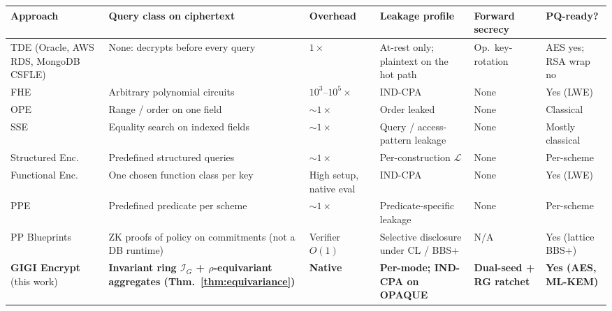 \documentclass[11pt,letterpaper]{article}
\begin{document}
\begin{table}[p]
\small
\setlength{\tabcolsep}{4pt}
\begin{tabular}{>{\raggedright\arraybackslash}p{2.6cm}>{\raggedright\arraybackslash}p{4.1cm}>{\raggedright\arraybackslash}p{1.4cm}>{\raggedright\arraybackslash}p{2.7cm}>{\raggedright\arraybackslash}p{2.0cm}>{\raggedright\arraybackslash}p{1.6cm}}
\toprule
\textbf{Approach} & \textbf{Query class on ciphertext} & \textbf{Overhead} & \textbf{Leakage profile} & \textbf{Forward secrecy} & \textbf{PQ-ready?} \\
\midrule
TDE (Oracle, AWS RDS, MongoDB CSFLE)
  & None: decrypts before every query
  & $1\times$
  & At-rest only; plaintext on the hot path
  & Op.\ key-rotation
  & AES yes; RSA wrap no \\
\addlinespace
FHE~\cite{gentry2009fhe,bgv2012,ckks2017}
  & Arbitrary polynomial circuits
  & $10^3$--$10^5\times$
  & IND-CPA
  & None
  & Yes (LWE) \\
\addlinespace
OPE~\cite{boldyreva2009ope,popa2011cryptdb}
  & Range / order on one field
  & ${\sim}1\times$
  & Order leaked
  & None
  & Classical \\
\addlinespace
SSE~\cite{curtmola2006sse}
  & Equality search on indexed fields
  & ${\sim}1\times$
  & Query / access-pattern leakage
  & None
  & Mostly classical \\
\addlinespace
Structured Enc.~\cite{chase2010structured}
  & Predefined structured queries
  & ${\sim}1\times$
  & Per-construction $\mathcal{L}$
  & None
  & Per-scheme \\
\addlinespace
Functional Enc.~\cite{boneh2011fe}
  & One chosen function class per key
  & High setup, native eval
  & IND-CPA
  & None
  & Yes (LWE) \\
\addlinespace
PPE~\cite{pandey2012ppe}
  & Predefined predicate per scheme
  & ${\sim}1\times$
  & Predicate-specific leakage
  & None
  & Per-scheme \\
\addlinespace
PP Blueprints~\cite{kohlweiss2023blueprints}
  & ZK proofs of policy on commitments (not a DB runtime)
  & Verifier $O(1)$
  & Selective disclosure under CL / BBS+
  & N/A
  & Yes (lattice BBS+) \\
\midrule
\textbf{GIGI Encrypt} (this work)
  & \textbf{Invariant ring $\mathcal{I}_G$ + $\rho$-equivariant aggregates (Thm.~\ref{thm:equivariance})}
  & \textbf{Native}
  & \textbf{Per-mode; IND-CPA on OPAQUE}
  & \textbf{Dual-seed + RG ratchet}
  & \textbf{Yes (AES, ML-KEM)} \\
\bottomrule
\end{tabular}
\vspace*{\fill}
\end{table}
\end{document}
